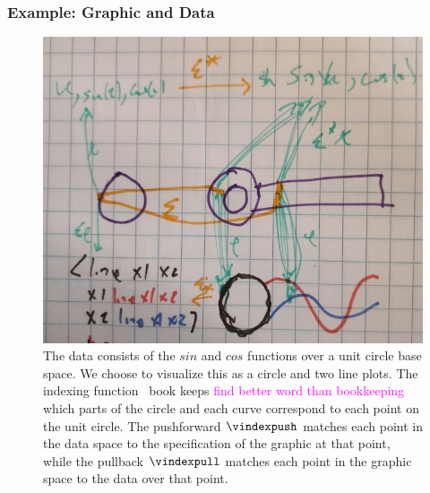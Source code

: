 \documentclass[journal]{IEEEtran}
\newcommand{\note}[1]{\textcolor{magenta}{#1}}
\theoremstyle{definition}
\theoremstyle{remark}
\begin{document}
\subsubsection{Example: Graphic and Data}
\begin{figure}[H]
  \includegraphics*[width=1\columnwidth]{xi_sin.png}
  \caption{The data consists of the $sin$ and $cos$ functions over a unit circle base space. We choose to visualize this as a circle and two line plots. The indexing function \vindex\ book keeps \note{find better word than bookkeeping} which parts of the circle and each curve correspond to each point on the unit circle. The pushforward $\vindexpush$ matches each point in the data space to the specification of the graphic at that point, while the pullback $\vindexpull$ matches each point in the graphic space to the data over that point. \label{fig:atct:morphisms:sheaf}}
\end{figure}
\end{document}
